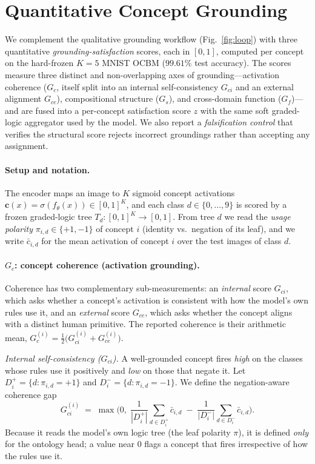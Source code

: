 \section{Quantitative Concept Grounding}
\label{app:grounding}

We complement the qualitative grounding workflow (Fig.~\ref{fig:loop}) with three
quantitative \emph{grounding-satisfaction} scores, each in $[0,1]$, computed
per concept on the hard-frozen $K{=}5$ MNIST OCBM ($99.61\%$ test accuracy). The
scores measure three distinct and non-overlapping axes of grounding---activation
coherence ($G_c$, itself split into an internal self-consistency $G_{ci}$ and an
external alignment $G_{ce}$), compositional structure ($G_s$), and cross-domain
function ($G_f$)---and are fused into a per-concept satisfaction score $z$ with the
same soft graded-logic aggregator used by the model. We also report a
\emph{falsification control} that verifies the structural score rejects incorrect
groundings rather than accepting any assignment.

\paragraph{Setup and notation.}
The encoder maps an image to $K$ sigmoid concept activations
$\mathbf c(x)=\sigma(f_\theta(x))\in[0,1]^K$, and each class $d\in\{0,\dots,9\}$ is
scored by a frozen graded-logic tree $T_d:[0,1]^K\!\to[0,1]$. From tree $d$ we read
the \emph{usage polarity} $\pi_{i,d}\in\{+1,-1\}$ of concept $i$ (identity vs.\
negation of its leaf), and we write $\bar c_{i,d}$ for the mean activation of
concept $i$ over the test images of class $d$.

\paragraph{$G_c$: concept coherence (activation grounding).}
Coherence has two complementary sub-measurements: an \emph{internal} score
$G_{ci}$, which asks whether a concept's activation is consistent with how the
model's own rules use it, and an \emph{external} score $G_{ce}$, which asks whether
the concept aligns with a distinct human primitive. The reported coherence is their
arithmetic mean, $G_c^{(i)}=\tfrac12\big(G_{ci}^{(i)}+G_{ce}^{(i)}\big)$.

\emph{Internal self-consistency ($G_{ci}$).} A well-grounded concept fires
\emph{high} on the classes whose rules use it positively and \emph{low} on those
that negate it. Let $D_i^{+}=\{d:\pi_{i,d}{=}{+}1\}$ and
$D_i^{-}=\{d:\pi_{i,d}{=}{-}1\}$. We define the negation-aware coherence gap
\begin{equation}
G_{ci}^{(i)} \;=\; \max\!\Big(0,\;
\frac{1}{|D_i^{+}|}\sum_{d\in D_i^{+}}\bar c_{i,d}
\;-\;
\frac{1}{|D_i^{-}|}\sum_{d\in D_i^{-}}\bar c_{i,d}\Big).
\end{equation}
Because it reads the model's own logic tree (the leaf polarity $\pi$), it is defined
\emph{only} for the ontology head; a value near $0$ flags a concept that fires
irrespective of how the rules use it.

